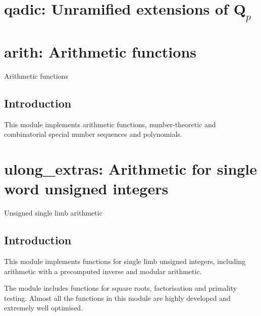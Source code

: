 \documentclass[a4paper,10pt]{book}
\newcommand{\Q}{\mathbf{Q}}%
\begin{document}
{{%

\chapter{qadic: Unramified extensions of $\Q_p$}



\chapter{arith: Arithmetic functions}
\epigraph{Arithmetic functions}{}

\section{Introduction}

This module implements arithmetic functions, number-theoretic and
combinatorial special number sequences and polynomials.




\chapter{ulong\_extras: Arithmetic for single word unsigned integers}
\epigraph{Unsigned single limb arithmetic}{}

\section{Introduction}

This module implements functions for single limb unsigned integers,
including arithmetic with a precomputed inverse and modular arithmetic.

The module includes functions for square roots, factorisation and
primality testing. Almost all the functions in this module are highly
developed and extremely well optimised.

}}
\end{document}
